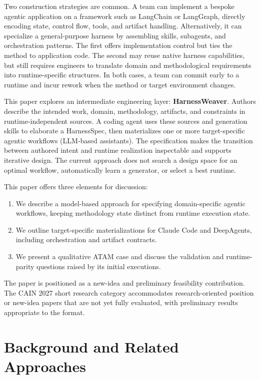 \documentclass[10pt,conference]{IEEEtran}
\begin{document}
Two construction strategies are common. A team can implement a bespoke agentic application on a framework such as LangChain or LangGraph, directly encoding state, control flow, tools, and artifact handling. Alternatively, it can specialize a general-purpose harness by assembling skills, subagents, and orchestration patterns. The first offers implementation control but ties the method to application code. The second may reuse native harness capabilities, but still requires engineers to translate domain and methodological requirements into runtime-specific structures. In both cases, a team can commit early to a runtime and incur rework when the method or target environment changes.

This paper explores an intermediate engineering layer: \textbf{HarnessWeaver}. Authors describe the intended work, domain, methodology, artifacts, and constraints in runtime-independent sources. A coding agent uses these sources and generation skills to elaborate a HarnessSpec, then materializes one or more target-specific agentic workflows (LLM-based assistants). The specification makes the transition between authored intent and runtime realization inspectable and supports iterative design. The current approach does not search a design space for an optimal workflow, automatically learn a generator, or select a best runtime.

This paper offers three elements for discussion:

\begin{enumerate}
\def\labelenumi{\arabic{enumi}.}

\item
  We describe a model-based approach for specifying domain-specific agentic workflows, keeping methodology state distinct from runtime execution state.
\item
  We outline target-specific materializations for Claude Code and DeepAgents, including orchestration and artifact contracts.
\item
  We present a qualitative ATAM case and discuss the validation and runtime-parity questions raised by its initial executions.
\end{enumerate}

The paper is positioned as a new-idea and preliminary feasibility contribution. The CAIN 2027 short research category accommodates research-oriented position or new-idea papers that are not yet fully evaluated, with preliminary results appropriate to the format.

\section{Background and Related Approaches}
\end{document}

